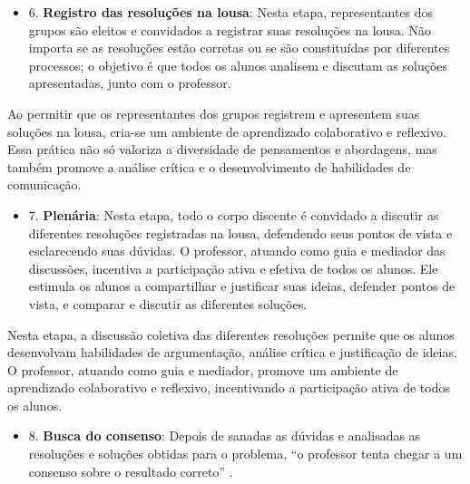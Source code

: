 \begin{itemize}
    \item 6. \textbf{Registro das resoluções na lousa}: Nesta etapa, representantes dos grupos são eleitos e convidados a registrar suas resoluções na lousa. Não importa se as resoluções estão corretas ou se são constituídas por diferentes processos; o objetivo é que todos os alunos analisem e discutam as soluções apresentadas, junto com o professor.
\end{itemize}

Ao permitir que os representantes dos grupos registrem e apresentem suas soluções na lousa, cria-se um ambiente de aprendizado colaborativo e reflexivo. Essa prática não só valoriza a diversidade de pensamentos e abordagens, mas também promove a análise crítica e o desenvolvimento de habilidades de comunicação.


\begin{itemize}
    \item 7. \textbf{Plenária}: Nesta etapa, todo o corpo discente é convidado a discutir as diferentes resoluções registradas na lousa, defendendo seus pontos de vista e esclarecendo suas dúvidas. O professor, atuando como guia e mediador das discussões, incentiva a participação ativa e efetiva de todos os alunos. Ele estimula os alunos a compartilhar e justificar suas ideias, defender pontos de vista, e comparar e discutir as diferentes soluções.
\end{itemize}

Nesta etapa, a discussão coletiva das diferentes resoluções permite que os alunos desenvolvam habilidades de argumentação, análise crítica e justificação de ideias. O professor, atuando como guia e mediador, promove um ambiente de aprendizado colaborativo e reflexivo, incentivando a participação ativa de todos os alunos.


\begin{itemize}
    \item 8. \textbf{Busca do consenso}: Depois de sanadas as dúvidas e analisadas as resoluções e soluções obtidas para o problema, ``o professor tenta chegar a um consenso sobre o resultado correto'' \cite[p. 46]{resolucaoDeProblemas2019}.
\end{itemize}

